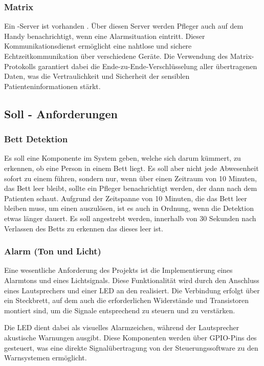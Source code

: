 \subsubsection{Matrix}
Ein -Server ist vorhanden \cite{Matrix}. Über diesen Server werden Pfleger auch auf dem Handy benachrichtigt, wenn eine Alarmsituation eintritt. Dieser Kommunikationsdienst ermöglicht eine nahtlose und sichere Echtzeitkommunikation über verschiedene Geräte. Die Verwendung des Matrix-Protokolls garantiert dabei die Ende-zu-Ende-Verschlüsselung aller übertragenen Daten, was die Vertraulichkeit und Sicherheit der sensiblen Patienteninformationen stärkt.


\subsection{Soll - Anforderungen}

\subsubsection{Bett Detektion}
Es soll eine Komponente im System geben, welche sich darum kümmert, zu erkennen, ob eine Person in einem Bett liegt. Es soll aber nicht jede Abwesenheit sofort zu einem  führen, sondern nur, wenn über einen Zeitraum von 10 Minuten, das Bett leer bleibt, sollte ein Pfleger benachrichtigt werden, der dann nach dem Patienten schaut. Aufgrund der Zeitspanne von 10 Minuten, die das Bett leer bleiben muss, um einen  auszulösen, ist es auch in Ordnung, wenn die Detektion etwas länger dauert. Es soll angestrebt werden, innerhalb von 30 Sekunden nach Verlassen des Betts zu erkennen das dieses leer ist. 

\subsubsection{Alarm (Ton und Licht)}
Eine wesentliche Anforderung des Projekts ist die Implementierung eines Alarmtons und eines Lichtsignals. Diese Funktionalität wird durch den Anschluss eines Lautsprechers und einer LED an den  realisiert. Die Verbindung erfolgt über ein Steckbrett, auf dem auch die erforderlichen Widerstände und Transistoren montiert sind, um die Signale entsprechend zu steuern und zu verstärken.

Die LED dient dabei als visuelles Alarmzeichen, während der Lautsprecher akustische Warnungen ausgibt. Diese Komponenten werden über GPIO-Pins des  gesteuert, was eine direkte Signalübertragung von der Steuerungssoftware zu den Warnsystemen ermöglicht.

